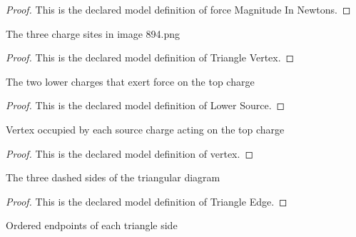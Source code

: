 \begin{proof}
  This is the declared model definition of force Magnitude In Newtons.
\end{proof}
\begin{definition}
  \label{def:physics:phyx-mini-0894:phyxminiproblems-problemphyxmini0894-trianglevertex}
  The three charge sites in image 894.png
\end{definition}
\begin{proof}
  This is the declared model definition of Triangle Vertex.
\end{proof}
\begin{definition}
  \label{def:physics:phyx-mini-0894:phyxminiproblems-problemphyxmini0894-lowersource}
  The two lower charges that exert force on the top charge
\end{definition}
\begin{proof}
  This is the declared model definition of Lower Source.
\end{proof}
\begin{definition}[vertex]
  \label{def:physics:phyx-mini-0894:phyxminiproblems-problemphyxmini0894-lowersource-vertex}
  Vertex occupied by each source charge acting on the top charge
\end{definition}
\begin{proof}
  This is the declared model definition of vertex.
\end{proof}
\begin{definition}
  \label{def:physics:phyx-mini-0894:phyxminiproblems-problemphyxmini0894-triangleedge}
  The three dashed sides of the triangular diagram
\end{definition}
\begin{proof}
  This is the declared model definition of Triangle Edge.
\end{proof}
\begin{definition}[endpoints]
  \label{def:physics:phyx-mini-0894:phyxminiproblems-problemphyxmini0894-triangleedge-endpoints}
  Ordered endpoints of each triangle side
\end{definition}

